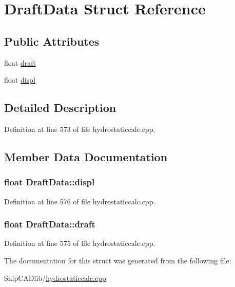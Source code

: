 \hypertarget{structDraftData}{}\section{Draft\+Data Struct Reference}
\label{structDraftData}
\subsection*{Public Attributes}
\begin{DoxyCompactItemize}
\item 
float \hyperlink{structDraftData_a3f20aeee5cac97b57e9fc5c5315f3ad1}{draft}
\item 
float \hyperlink{structDraftData_ad911e175c740aa5e4e1bba6f5db3b448}{displ}
\end{DoxyCompactItemize}


\subsection{Detailed Description}


Definition at line 573 of file hydrostaticcalc.\+cpp.



\subsection{Member Data Documentation}
\subsubsection[{\texorpdfstring{displ}{displ}}]{\setlength{\rightskip}{0pt plus 5cm}float Draft\+Data\+::displ}\hypertarget{structDraftData_ad911e175c740aa5e4e1bba6f5db3b448}{}\label{structDraftData_ad911e175c740aa5e4e1bba6f5db3b448}


Definition at line 576 of file hydrostaticcalc.\+cpp.

\subsubsection[{\texorpdfstring{draft}{draft}}]{\setlength{\rightskip}{0pt plus 5cm}float Draft\+Data\+::draft}\hypertarget{structDraftData_a3f20aeee5cac97b57e9fc5c5315f3ad1}{}\label{structDraftData_a3f20aeee5cac97b57e9fc5c5315f3ad1}


Definition at line 575 of file hydrostaticcalc.\+cpp.



The documentation for this struct was generated from the following file\+:\begin{DoxyCompactItemize}
\item 
Ship\+C\+A\+Dlib/\hyperlink{hydrostaticcalc_8cpp}{hydrostaticcalc.\+cpp}\end{DoxyCompactItemize}
